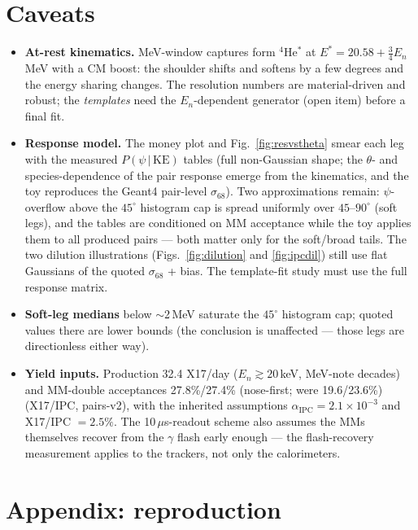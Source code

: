 \documentclass[11pt,a4paper]{article}
\newcommand{\He}[1]{$^{#1}$He}
\newcommand{\sig}[1]{\sigma_{68}^{#1}}
\begin{document}
\section{Caveats}

\begin{itemize}
\item \textbf{At-rest kinematics.} MeV-window captures form \He{4}$^{*}$ at
  $E^{*} = 20.58 + \tfrac34 E_n$\,MeV with a CM boost: the shoulder shifts
  and softens by a few degrees and the energy sharing changes. The
  resolution numbers are material-driven and robust; the \emph{templates}
  need the $E_n$-dependent generator (open item) before a final fit.
\item \textbf{Response model.} The money plot and
  Fig.~\ref{fig:resvstheta} smear each leg with the measured
  $P(\psi\,|\,\mathrm{KE})$ tables (full non-Gaussian shape; the
  $\theta$- and species-dependence of the pair response emerge from the
  kinematics, and the toy reproduces the Geant4 pair-level $\sig{}$).
  Two approximations remain: $\psi$-overflow above the $45^{\circ}$
  histogram cap is spread uniformly over $45$--$90^{\circ}$ (soft legs),
  and the tables are conditioned on MM acceptance while the toy applies
  them to all produced pairs --- both matter only for the soft/broad
  tails. The two dilution illustrations (Figs.~\ref{fig:dilution} and
  \ref{fig:ipcdil}) still use flat Gaussians of the quoted $\sig{}$ +
  bias. The template-fit study must use the full response matrix.
\item \textbf{Soft-leg medians} below $\sim$2\,MeV saturate the $45^{\circ}$
  histogram cap; quoted values there are lower bounds (the conclusion is
  unaffected --- those legs are directionless either way).
\item \textbf{Yield inputs.} Production 32.4 X17/day ($E_n \gtrsim
  20$\,keV, MeV-note decades) and MM-double acceptances 27.8\%/27.4\% (nose-first; were 19.6/23.6\%)
  (X17/IPC, pairs-v2), with the inherited assumptions
  $\alpha_{\mathrm{IPC}}=2.1\times10^{-3}$ and X17/IPC $=2.5\%$. The
  10\,$\mu$s-readout scheme also assumes the MMs themselves recover from
  the $\gamma$ flash early enough --- the flash-recovery measurement
  applies to the trackers, not only the calorimeters.
\end{itemize}

\clearpage
\section*{Appendix: reproduction}
\end{document}
